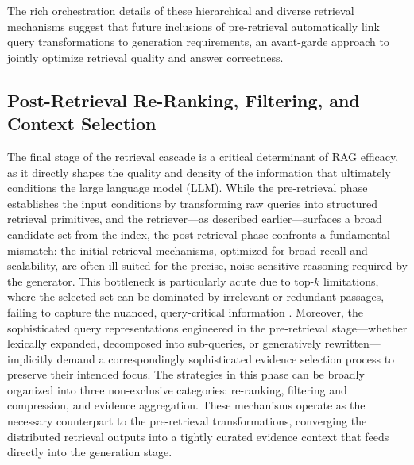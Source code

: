 \documentclass[11pt,a4paper]{article}
\begin{document}
The rich orchestration details of these hierarchical and diverse retrieval mechanisms suggest that future inclusions of pre-retrieval automatically link query transformations to generation requirements, an avant-garde approach to jointly optimize retrieval quality and answer correctness.


\subsection{Post-Retrieval Re-Ranking, Filtering, and Context Selection}


The final stage of the retrieval cascade is a critical determinant of RAG efficacy, as it directly shapes the quality and density of the information that ultimately conditions the large language model (LLM). While the pre-retrieval phase establishes the input conditions by transforming raw queries into structured retrieval primitives, and the retriever---as described earlier---surfaces a broad candidate set from the index, the post-retrieval phase confronts a fundamental mismatch: the initial retrieval mechanisms, optimized for broad recall and scalability, are often ill-suited for the precise, noise-sensitive reasoning required by the generator. This bottleneck is particularly acute due to top-\(k\) limitations, where the selected set can be dominated by irrelevant or redundant passages, failing to capture the nuanced, query-critical information \cite{arxiv:2407.01219v1}. Moreover, the sophisticated query representations engineered in the pre-retrieval stage---whether lexically expanded, decomposed into sub-queries, or generatively rewritten---implicitly demand a correspondingly sophisticated evidence selection process to preserve their intended focus. The strategies in this phase can be broadly organized into three non-exclusive categories: re-ranking, filtering and compression, and evidence aggregation. These mechanisms operate as the necessary counterpart to the pre-retrieval transformations, converging the distributed retrieval outputs into a tightly curated evidence context that feeds directly into the generation stage.
\end{document}
